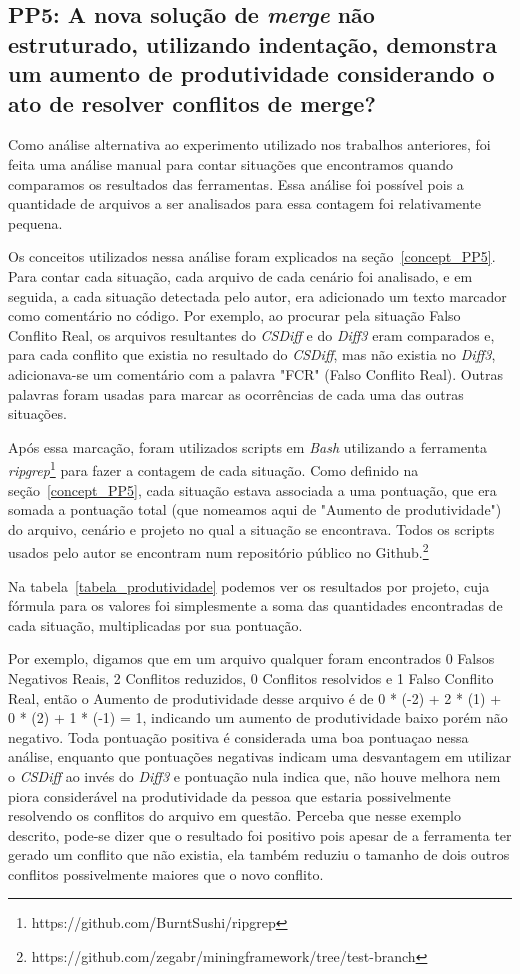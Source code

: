 \subsection{PP5: A nova solução de \emph{merge} não estruturado, utilizando indentação,
	demonstra um aumento de produtividade considerando o ato de resolver conflitos de merge?}

Como análise alternativa ao experimento utilizado nos trabalhos anteriores, foi
feita uma análise manual para contar situações que encontramos quando
comparamos os resultados das ferramentas. Essa análise foi possível pois a
quantidade de arquivos a ser analisados para essa contagem foi relativamente
pequena.

Os conceitos utilizados nessa análise foram explicados na
seção~\ref{concept_PP5}. Para contar cada situação, cada arquivo de cada
cenário foi analisado, e em seguida, a cada situação detectada pelo autor, era
adicionado um texto marcador como comentário no código. Por exemplo, ao
procurar pela situação Falso Conflito Real, os arquivos resultantes do
\emph{CSDiff} e do \emph{Diff3} eram comparados e, para cada conflito que
existia no resultado do \emph{CSDiff}, mas não existia no \emph{Diff3},
adicionava-se um comentário com a palavra "FCR" (Falso Conflito Real). Outras
palavras foram usadas para marcar as ocorrências de cada uma das outras
situações.

Após essa marcação, foram utilizados scripts em \emph{Bash} utilizando a
ferramenta \emph{ripgrep}\footnote{https://github.com/BurntSushi/ripgrep} para
fazer a contagem de cada situação. Como definido na seção~\ref{concept_PP5},
cada situação estava associada a uma pontuação, que era somada a pontuação
total (que nomeamos aqui de "Aumento de produtividade") do arquivo, cenário e
projeto no qual a situação se encontrava. Todos os scripts usados pelo autor se
encontram num repositório público no
Github.\footnote{https://github.com/zegabr/miningframework/tree/test-branch} %

Na tabela~\ref{tabela_produtividade} podemos ver os resultados por projeto,
cuja fórmula para os valores foi simplesmente a soma das quantidades
encontradas de cada situação, multiplicadas por sua pontuação.

Por exemplo, digamos que em um arquivo qualquer foram encontrados 0 Falsos
Negativos Reais, 2 Conflitos reduzidos, 0 Conflitos resolvidos e 1 Falso
Conflito Real, então o Aumento de produtividade desse arquivo é de 0 * (-2) + 2
* (1) + 0 * (2) + 1 * (-1) = 1, indicando um aumento de produtividade baixo
porém não negativo. Toda pontuação positiva é considerada uma boa pontuaçao
nessa análise, enquanto que pontuações negativas indicam uma desvantagem em
utilizar o \emph{CSDiff} ao invés do \emph{Diff3} e pontuação nula indica que,
não houve melhora nem piora considerável na produtividade da pessoa que estaria
possivelmente resolvendo os conflitos do arquivo em questão. Perceba que nesse
exemplo descrito, pode-se dizer que o resultado foi positivo pois apesar de a
ferramenta ter gerado um conflito que não existia, ela também reduziu o tamanho
de dois outros conflitos possivelmente maiores que o novo conflito.

